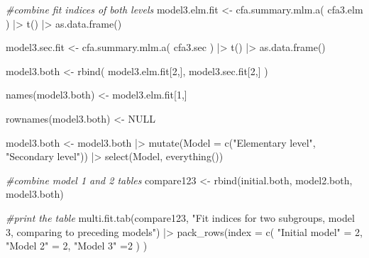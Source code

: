 \documentclass[
]{article}
\newenvironment{Shaded}{\begin{snugshade}}{\end{snugshade}}
\newcommand{\AttributeTok}[1]{\textcolor[rgb]{0.77,0.63,0.00}{#1}}
\newcommand{\CommentTok}[1]{\textcolor[rgb]{0.56,0.35,0.01}{\textit{#1}}}
\newcommand{\ConstantTok}[1]{\textcolor[rgb]{0.00,0.00,0.00}{#1}}
\newcommand{\DecValTok}[1]{\textcolor[rgb]{0.00,0.00,0.81}{#1}}
\newcommand{\FunctionTok}[1]{\textcolor[rgb]{0.00,0.00,0.00}{#1}}
\newcommand{\NormalTok}[1]{#1}
\newcommand{\OtherTok}[1]{\textcolor[rgb]{0.56,0.35,0.01}{#1}}
\newcommand{\SpecialCharTok}[1]{\textcolor[rgb]{0.00,0.00,0.00}{#1}}
\newcommand{\StringTok}[1]{\textcolor[rgb]{0.31,0.60,0.02}{#1}}
\begin{document}
\begin{Shaded}
\begin{Highlighting}[]
\CommentTok{\#combine fit indices of both levels}
\NormalTok{model3.elm.fit }\OtherTok{\textless{}{-}} 
  \FunctionTok{cfa.summary.mlm.a}\NormalTok{(}
\NormalTok{    cfa3.elm}
\NormalTok{    ) }\SpecialCharTok{|\textgreater{}} 
  \FunctionTok{t}\NormalTok{() }\SpecialCharTok{|\textgreater{}} 
  \FunctionTok{as.data.frame}\NormalTok{()}

\NormalTok{model3.sec.fit }\OtherTok{\textless{}{-}} 
  \FunctionTok{cfa.summary.mlm.a}\NormalTok{(}
\NormalTok{    cfa3.sec}
\NormalTok{    ) }\SpecialCharTok{|\textgreater{}} 
  \FunctionTok{t}\NormalTok{() }\SpecialCharTok{|\textgreater{}} 
  \FunctionTok{as.data.frame}\NormalTok{()}

\NormalTok{model3.both }\OtherTok{\textless{}{-}} 
  \FunctionTok{rbind}\NormalTok{(}
\NormalTok{    model3.elm.fit[}\DecValTok{2}\NormalTok{,], }
\NormalTok{    model3.sec.fit[}\DecValTok{2}\NormalTok{,]}
\NormalTok{    ) }

\FunctionTok{names}\NormalTok{(model3.both) }\OtherTok{\textless{}{-}}\NormalTok{ model3.elm.fit[}\DecValTok{1}\NormalTok{,]}

\FunctionTok{rownames}\NormalTok{(model3.both) }\OtherTok{\textless{}{-}} \ConstantTok{NULL}

\NormalTok{model3.both }\OtherTok{\textless{}{-}} 
\NormalTok{  model3.both }\SpecialCharTok{|\textgreater{}} 
  \FunctionTok{mutate}\NormalTok{(}\AttributeTok{Model =} \FunctionTok{c}\NormalTok{(}\StringTok{"Elementary level"}\NormalTok{,}
    \StringTok{"Secondary level"}\NormalTok{)) }\SpecialCharTok{|\textgreater{}} 
  \FunctionTok{select}\NormalTok{(Model, }\FunctionTok{everything}\NormalTok{())}

\CommentTok{\#combine model 1 and 2 tables}
\NormalTok{compare123 }\OtherTok{\textless{}{-}} \FunctionTok{rbind}\NormalTok{(initial.both, model2.both, model3.both)}

\CommentTok{\#print the table}
\FunctionTok{multi.fit.tab}\NormalTok{(compare123, }
              \StringTok{"Fit indices for two subgroups, model 3, comparing to preceding models"}\NormalTok{) }\SpecialCharTok{|\textgreater{}} 
  \FunctionTok{pack\_rows}\NormalTok{(}\AttributeTok{index =} \FunctionTok{c}\NormalTok{(}
    \StringTok{"Initial model"} \OtherTok{=} \DecValTok{2}\NormalTok{,}
    \StringTok{"Model 2"} \OtherTok{=} \DecValTok{2}\NormalTok{,}
    \StringTok{"Model 3"} \OtherTok{=}\DecValTok{2}
\NormalTok{  )}
\NormalTok{  )}
\end{Highlighting}
\end{Shaded}
\end{document}
